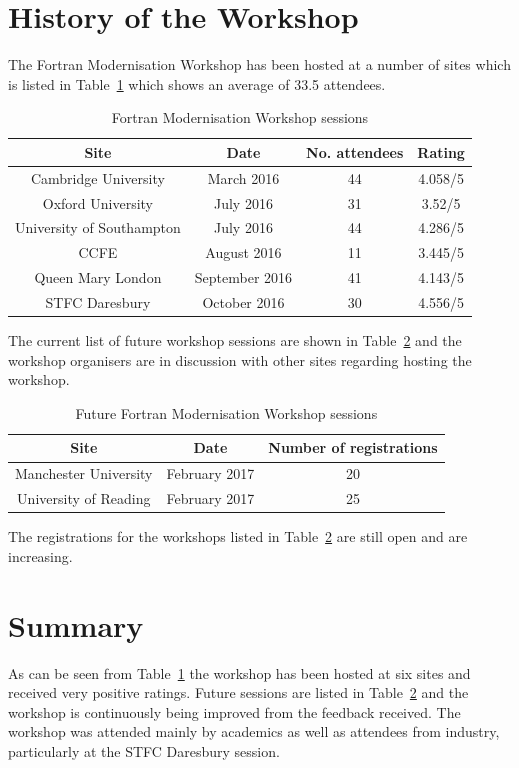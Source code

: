 \documentclass[12pt]{article}
\begin{document}
\section{History of the Workshop}
The Fortran Modernisation Workshop has been hosted at a number of sites which is listed in Table~\ref{fmw:sites} which shows
an average of 33.5 attendees. 
\begin{table}[H]
\centering 
\begin{tabular}{|c|c|c|c|}
\hline
{\bf Site} & {\bf Date} & {\bf No. attendees} & {\bf Rating} \\ \hline
Cambridge University & March 2016 & 44 & 4.058/5 \\ \hline
Oxford University & July 2016 & 31 & 3.52/5 \\ \hline 
University of Southampton & July 2016 & 44 & 4.286/5 \\ \hline
CCFE & August 2016 & 11 & 3.445/5 \\ \hline
Queen Mary London & September 2016 & 41 & 4.143/5 \\ \hline
STFC Daresbury & October 2016 & 30 & 4.556/5 \\ \hline
\end{tabular}
\caption{Fortran Modernisation Workshop sessions}
\label{fmw:sites}
\end{table}
The current list of future workshop sessions are shown in Table~\ref{fmw:future} and the workshop organisers are in
discussion with other sites regarding hosting the workshop. 
\begin{table}[H]
\centering 
\begin{tabular}{|c|c|c|}
\hline
{\bf Site} & {\bf Date} & {\bf Number of registrations} \\ \hline
Manchester University & February 2017 & 20 \\ \hline
University of Reading & February 2017 & 25 \\ \hline 
\end{tabular}
\caption{Future Fortran Modernisation Workshop sessions}
\label{fmw:future}
\end{table}
The registrations for the workshops listed in Table~\ref{fmw:future} are still open and are increasing. 
\section{Summary}
As can be seen from Table~\ref{fmw:sites} the workshop has been hosted at six sites and received very positive ratings.
Future sessions are listed in Table~\ref{fmw:future} and the workshop is continuously being improved from the feedback received.
The workshop was attended mainly by academics as well as attendees from industry, particularly at the STFC Daresbury session. \\


%
%
\end{document}
